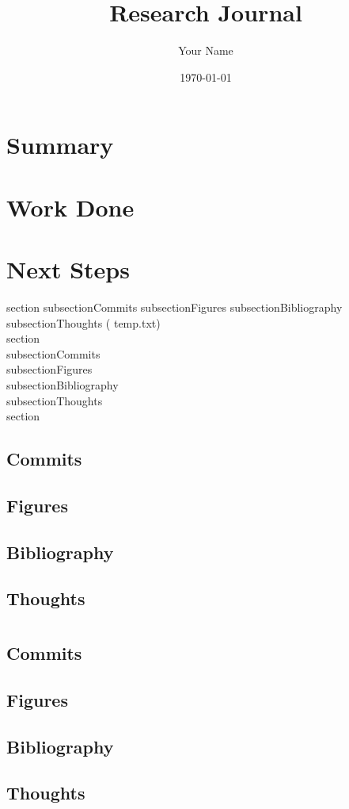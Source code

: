 \documentclass{article}
\begin{document}
\title{Research Journal}
\author{Your Name}
\date{\today}

\maketitle

\section{Summary}

\section{Work Done}

\section{Next Steps}



section{}
 subsection{Commits}
 subsection{Figures}
 subsection{Bibliography}
 subsection{Thoughts}
( temp.txt)
\\section{}
 \\subsection{Commits}
 \\subsection{Figures}
 \\subsection{Bibliography}
 \\subsection{Thoughts}
\\section{}
\subsection{Commits}
\subsection{Figures}
\subsection{Bibliography}
\subsection{Thoughts}
\section{}
\subsection{Commits}
\subsection{Figures}
\subsection{Bibliography}
\subsection{Thoughts}
\end{document}
